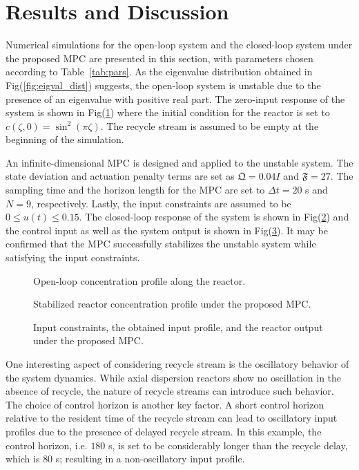 \section{Results and Discussion}

Numerical simulations for the open-loop system and the closed-loop system under the proposed MPC are presented in this section, with parameters chosen according to Table~\ref{tab:pars}. As the eigenvalue distribution obtained in Fig(\ref{fig:eigval_dist}) suggests, the open-loop system is unstable due to the presence of an eigenvalue with positive real part. The zero-input response of the system is shown in Fig(\ref{fig:openloop_response}) where the initial condition for the reactor is set to $c(\zeta,0) = \sin^2(\pi \zeta)$. The recycle stream is assumed to be empty at the beginning of the simulation.

An infinite-dimensional MPC is designed and applied to the unstable system. The state deviation and actuation penalty terms are set as $\mathfrak{Q} = 0.04 I$ and $\mathfrak{F} = 27$. The sampling time and the horizon length for the MPC are set to $\Delta t = 20$ s and $N = 9$, respectively. Lastly, the input constraints are assumed to be $0 \leq u(t) \leq 0.15$. The closed-loop response of the system is shown in Fig(\ref{fig:closedloop_response}) and the control input as well as the system output is shown in Fig(\ref{fig:control_input}). It may be confirmed that the MPC successfully stabilizes the unstable system while satisfying the input constraints.

\begin{figure}[!htbp]
    \centering
    
    \caption{Open-loop concentration profile along the reactor.}
    \label{fig:openloop_response}
\end{figure}

\begin{figure}[!htbp]
    \centering
    
    \caption{Stabilized reactor concentration profile under the proposed MPC.}
    \label{fig:closedloop_response}
\end{figure}

\begin{figure}[!htbp]
    \centering
    
    \caption{Input constraints, the obtained input profile, and the reactor output under the proposed MPC.}
    \label{fig:control_input}
\end{figure}

One interesting aspect of considering recycle stream is the oscillatory behavior of the system dynamics. While axial dispersion reactors show no oscillation in the absence of recycle, the nature of recycle streams can introduce such behavior. The choice of control horizon is another key factor. A short control horizon relative to the resident time of the recycle stream can lead to oscillatory input profiles due to the presence of delayed recycle stream. In this example, the control horizon, i.e. $180$ s, is set to be considerably longer than the recycle delay, which is $80$ s; resulting in a non-oscillatory input profile.